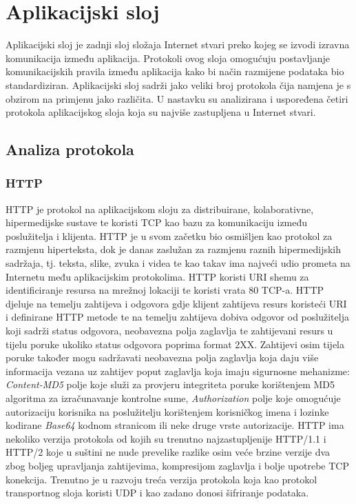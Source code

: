 \documentclass[times, utf8, diplomski]{fer}
\begin{document}
\section{Aplikacijski sloj}
Aplikacijski sloj je zadnji sloj složaja Internet stvari preko kojeg se izvodi izravna komunikacija između aplikacija. Protokoli ovog sloja omogućuju postavljanje komunikacijskih pravila između aplikacija kako bi način razmijene podataka bio standardiziran. Aplikacijski sloj sadrži jako veliki broj protokola čija namjena je s obzirom na primjenu jako različita. U nastavku su analizirana i uspoređena četiri protokola aplikacijskog sloja koja su najviše zastupljena u Internet stvari.

\subsection{Analiza protokola}
\subsubsection{HTTP}
HTTP  je protokol na aplikacijskom sloju za distribuirane, kolaborativne, hipermedijske sustave te koristi TCP kao bazu za komunikaciju između poslužitelja i klijenta. HTTP je u svom začetku bio osmišljen kao protokol za razmjenu hiperteksta, dok je danas zaslužan za razmjenu raznih hipermedijskih sadržaja, tj. teksta, slike, zvuka i videa te kao takav ima najveći udio prometa na Internetu među aplikacijskim protokolima. HTTP koristi URI  shemu za identificiranje resursa na mrežnoj lokaciji te koristi vrata 80 TCP-a. HTTP djeluje na temelju zahtijeva i odgovora gdje klijent zahtijeva resurs koristeći URI i definirane HTTP metode te na temelju zahtijeva dobiva odgovor od poslužitelja koji sadrži status odgovora, neobavezna polja zaglavlja te zahtijevani resurs u tijelu poruke ukoliko status odgovora poprima format 2XX. Zahtijevi osim tijela poruke također mogu sadržavati neobavezna polja zaglavlja koja daju više informacija vezana uz zahtijev poput zaglavlja koja imaju sigurnosne mehanizme: \emph{Content-MD5} polje koje služi za provjeru integriteta poruke korištenjem MD5 algoritma za izračunavanje kontrolne sume, \emph{Authorization} polje koje omogućuje autorizaciju korisnika na poslužitelju korištenjem korisničkog imena i lozinke kodirane \emph{Base64} kodnom stranicom ili neke druge vrste autorizacije. HTTP ima nekoliko verzija protokola od kojih su trenutno najzastupljenije HTTP/1.1 i HTTP/2 koje u suštini ne nude prevelike razlike osim veće brzine verzije dva zbog boljeg upravljanja zahtijevima, kompresijom zaglavlja i bolje upotrebe TCP konekcija. Trenutno je u razvoju treća verzija protokola koja kao protokol transportnog sloja koristi UDP i kao zadano donosi šifriranje podataka.
\end{document}

